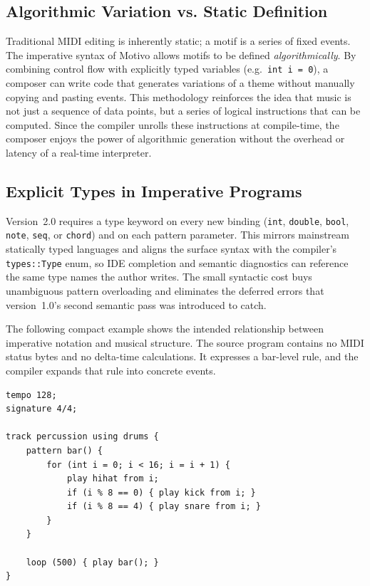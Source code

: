 \subsection{Algorithmic Variation vs. Static
Definition}\label{detail-subsec:algorithmic-variation-vs.-static-definition}

Traditional MIDI editing is inherently static; a motif is a series of fixed events.
The imperative syntax of Motivo allows motifs to be defined \textit{algorithmically}.
By combining control flow with explicitly typed variables (e.g.\ \texttt{int i = 0}), a composer can write code that
generates variations of a theme without manually copying and pasting events.
This methodology reinforces the idea that music is not just a sequence of data points, but a series of logical
instructions that can be computed.
Since the compiler unrolls these instructions at compile-time, the composer enjoys the power of algorithmic generation
without the overhead or latency of a real-time interpreter.

\subsection{Explicit Types in Imperative Programs}\label{detail-subsec:explicit-types-syntax}

Version~2.0 requires a type keyword on every new binding (\texttt{int}, \texttt{double}, \texttt{bool},
\texttt{note}, \texttt{seq}, or \texttt{chord}) and on each pattern parameter.
This mirrors mainstream statically typed languages and aligns the surface syntax with the compiler's
\texttt{types::Type} enum, so IDE completion and semantic diagnostics can reference the same type names the author
writes.
The small syntactic cost buys unambiguous pattern overloading and eliminates the deferred errors that version~1.0's
second semantic pass was introduced to catch.

The following compact example shows the intended relationship between imperative notation and musical
structure. The source program contains no MIDI status bytes and no delta-time calculations. It expresses a
bar-level rule, and the compiler expands that rule into concrete events.

\begin{lstlisting}[language=Motivo, caption={A compact Motivo drum pattern.}, label={lst:motivo-groove}]
tempo 128;
signature 4/4;

track percussion using drums {
    pattern bar() {
        for (int i = 0; i < 16; i = i + 1) {
            play hihat from i;
            if (i % 8 == 0) { play kick from i; }
            if (i % 8 == 4) { play snare from i; }
        }
    }

    loop (500) { play bar(); }
}
\end{lstlisting}

